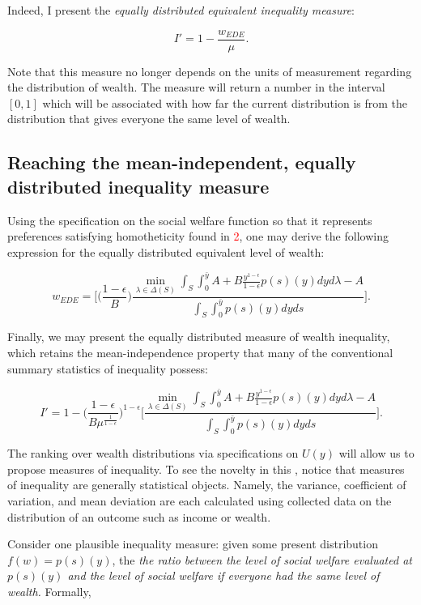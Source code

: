 \documentclass[\econtexRoot/IneqMeas]{subfiles}
\begin{document}
\par Indeed, I present the \textit{equally distributed equivalent inequality measure}:

$$ I' = 1 - \frac{w_{EDE}}{\mu}. $$

\par Note that this measure no longer depends on the units of measurement regarding the distribution of wealth. The measure will return a number in the interval $[0,1]$ which will be associated with how far the current distribution is from the distribution that gives everyone the same level of wealth.

\subsection{Reaching the mean-independent, equally distributed inequality measure}
 
\par Using the specification on the social welfare function so that it represents preferences satisfying homotheticity found in \textcolor{red}{2}, one may derive the following expression for the equally distributed equivalent level of wealth:

$$ w_{EDE} = \bigg[ \bigg(\frac{1-\epsilon}{B}\bigg) \frac{\min_{\lambda \in \Delta(S)}  \int_{S} \int_{0}^{\bar{y}} A + B \frac{y^{1-\epsilon}}{1-\epsilon} p(s)(y) dy d\lambda - A   }{\int_S \int_{0}^{\bar{y}} p(s)(y) dy ds } \bigg]. $$

\par Finally, we may present the equally distributed measure of wealth inequality, which retains the mean-independence property that many of the conventional summary statistics of inequality possess:

$$ I' = 1 - \bigg( \frac{1 - \epsilon}{B \mu^{\frac{1}{1-\epsilon}}} \bigg)^{1-\epsilon}  \bigg[ \frac{\min_{\lambda \in \Delta(S)}  \int_{S} \int_{0}^{\bar{y}} A + B \frac{y^{1-\epsilon}}{1-\epsilon} p(s)(y) dy d\lambda - A   }{\int_S \int_{0}^{\bar{y}} p(s)(y) dy ds } \bigg].$$
\par The ranking over wealth distributions via specifications on $U(y)$ will allow us to propose measures of inequality. To see the novelty in this , notice that measures of inequality are generally statistical objects. Namely, the variance, coefficient of variation, and mean deviation are each calculated using collected data on the distribution of an outcome such as income or wealth.

\par Consider one plausible inequality measure: given some present distribution $f(w) = p(s)(y)$, the \textit{the ratio between the level of social welfare evaluated at $p(s)(y)$ and the level of social welfare if everyone had the same level of wealth.} Formally,
\end{document}
